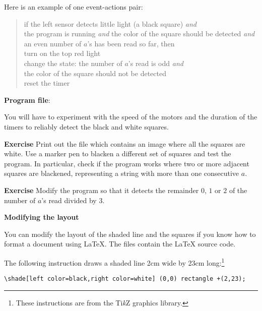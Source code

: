 Here is an example of one event-actions pair:


\begin{quote}
if the left sensor detects little light (a black square) \emph{and}\\
\hspace*{1em} the program is running \emph{and}
the color of the square should be detected \emph{and}\\
\hspace*{1em} an even number of $a$'s has been read so far, then\\
\hspace*{2em} turn on the top red light\\
\hspace*{2em} change the state: the number of $a$'s
read is odd \emph{and}\\
\hspace*{4em} the color of the square should not be detected\\
\hspace*{2em} reset the timer
\end{quote}

{\raggedleft \hfill \textbf{Program file}: }

You will have to experiment with the speed of the motors and the
duration of the timers to reliably detect the black and white squares.

\textbf{Exercise} Print out the file  which
contains an image where all the squares are white. Use a marker pen to
blacken a different set of squares and test the program. In particular,
check if the program works where two or more adjacent squares are
blackened, representing a string with more than one consecutive $a$.

\textbf{Exercise} Modify the program so that it detects the remainder
$0$, $1$ or $2$ of the number of $a$'s read divided by $3$.

\bigskip

\textbf{Modifying the layout}

You can modify the layout of the shaded line and the squares if you
know how to format a document using \LaTeX{}. The files  contain the \LaTeX{} source code. 

The following instruction draws a shaded line 2cm wide by 23cm
 long:\footnote{These instructions are from the Ti\textit{k}Z
graphics library.}
\begin{footnotesize}
\begin{verbatim}
\shade[left color=black,right color=white] (0,0) rectangle +(2,23);
\end{verbatim}
\end{footnotesize}

